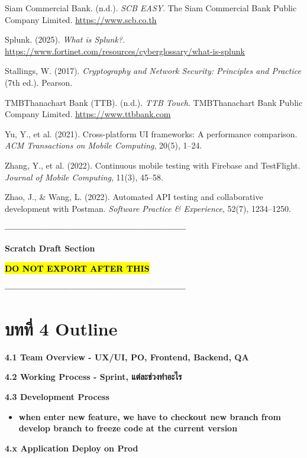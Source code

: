 Siam Commercial Bank. (n.d.). \emph{SCB EASY}. The Siam Commercial Bank
Public Company Limited.
\href{https://www.scb.co.th}{\ul{https://www.scb.co.th}}

Splunk. (2025). \emph{What is Splunk?.}
\href{https://www.fortinet.com/resources/cyberglossary/what-is-splunk}{\ul{https://www.fortinet.com/resources/cyberglossary/what-is-splunk}}

Stallings, W. (2017). \emph{Cryptography and Network Security:
Principles and Practice} (7th ed.). Pearson.

TMBThanachart Bank (TTB). (n.d.). \emph{TTB Touch}. TMBThanachart Bank
Public Company Limited.
\href{https://www.ttbbank.com}{\ul{https://www.ttbbank.com}}

Yu, Y., et al. (2021). Cross-platform UI frameworks: A performance
comparison. \emph{ACM Transactions on Mobile Computing}, 20(5), 1--24.

Zhang, Y., et al. (2022). Continuous mobile testing with Firebase and
TestFlight. \emph{Journal of Mobile Computing}, 11(3), 45--58.

Zhao, J., \& Wang, L. (2022). Automated API testing and collaborative
development with Postman. \emph{Software Practice \& Experience}, 52(7),
1234--1250.

\textbf{---------------------------------------------------------}

\textbf{Scratch Draft Section}

\textbf{\hl{DO NOT EXPORT AFTER THIS}}

\textbf{---------------------------------------------------------}

\section{\texorpdfstring{\textbf{บทที่ 4 Outline}
}{บทที่ 4 Outline }}\label{uxe1auxe17uxe17-4-outline}

\textbf{4.1 Team Overview - UX/UI, PO, Frontend, Backend, QA}

\textbf{4.2 Working Process - Sprint, แต่ละช่วงทำอะไร}

\textbf{4.3 Development Process}

\begin{itemize}
\item
  \textbf{when enter new feature, we have to checkout new branch from
  develop branch to freeze code at the current version}
\end{itemize}

\textbf{4.x Application Deploy on Prod}

